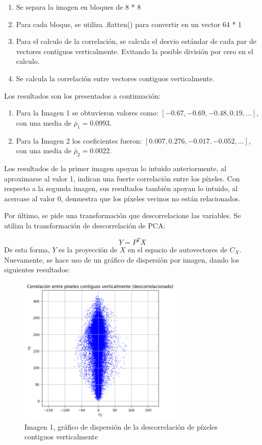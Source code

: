 \documentclass[a4paper,12pt]{article}
\numberwithin{equation}{section}
\numberwithin{figure}{section}
\begin{document}
\begin{enumerate}
    \item Se separa la imagen en bloques de 8 * 8
    \item Para cada bloque, se utiliza .flatten() para convertir en un vector 64 * 1
    \item Para el calculo de la correlación, se calcula el desvio estándar de cada par de vectores contiguos verticalmente. 
    Evitando la posible división por cero en el calculo.
    \item Se calcula la correlación entre vectores contiguos verticalmente.
\end{enumerate}

Los resultados son los presentados a continuación:
\begin{enumerate}
    \item Para la Imagen 1 se obtuvieron valores como: 
    $[-0.67, -0.69, -0.48, 0.19, \dots]$, 
    con una media de $\bar{\rho}_1 = 0.0993$. 

    \item Para la Imagen 2 los coeficientes fueron: 
    $[0.007, 0.276, -0.017, -0.052, \dots]$, 
    con una media de $\bar{\rho}_2 = 0.0022$.
\end{enumerate}

Los resultados de la primer imagen apoyan lo intuido anteriormente, al aproximarse al valor 1, indican una fuerte correlación entre los píxeles.
Con respecto a la segunda imagen, sus resultados también apoyan lo intuido, al acercase al valor 0, demuestra que los píxeles vecinos no están relacionados.

Por último, se pide una transformación que descorrelacione las variables.
Se utiliza la transformación de descorrelación de PCA:

\[
Y = P^T X
\]
De esta forma, \(Y\) es la proyección de \(X\) en el espacio de autovectores de \(C_X\).
\\
Nuevamente, se hace uso de un gráfico de dispersión por imagen, dando los siguientes resultados:

\begin{figure}[H]
    \centering
    \includegraphics[width=0.7\textwidth]{Ejercicio1c.png}
    \caption{Imagen 1, gráfico de dispersión de la descorrelación de píxeles contiguos verticalmente}
    \label{fig:descorrelacion1}
\end{figure}
\end{document}
